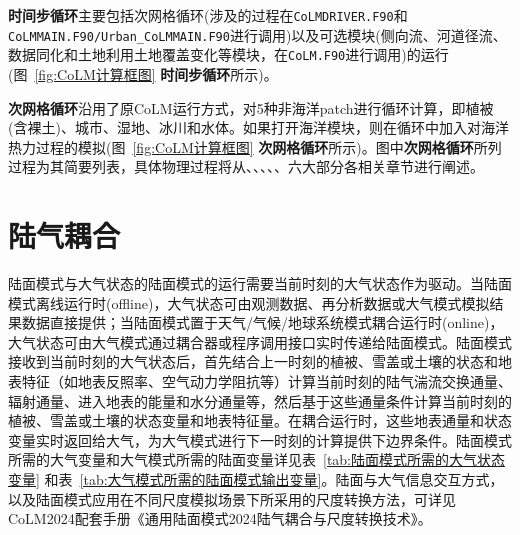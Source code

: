 \textbf{时间步循环}主要包括次网格循环(涉及的过程在\texttt{CoLMDRIVER.F90}和\texttt{CoLMMAIN.F90\allowbreak /Urban\allowbreak \_CoLMMAIN.F90}进行调用)以及可选模块(侧向流、河道径流、数据同化和土地利用土地覆盖变化等模块，在\texttt{CoLM.F90}进行调用)的运行(图~\ref{fig:CoLM计算框图} \textbf{时间步循环}所示)。

\textbf{次网格循环}沿用了原CoLM运行方式，对5种非海洋patch进行循环计算，即植被(含裸土)、城市、湿地、冰川和水体。如果打开海洋模块，则在循环中加入对海洋热力过程的模拟(图~\ref{fig:CoLM计算框图} \textbf{次网格循环}所示)。图中\textbf{次网格循环}所列过程为其简要列表，具体物理过程将从、、、、、六大部分各相关章节进行阐述。

\section{陆气耦合}\label{陆气耦合}

陆面模式与大气状态的陆面模式的运行需要当前时刻的大气状态作为驱动。当陆面模式离线运行时(offline)，大气状态可由观测数据、再分析数据或大气模式模拟结果数据直接提供；当陆面模式置于天气/气候/地球系统模式耦合运行时(online)，大气状态可由大气模式通过耦合器或程序调用接口实时传递给陆面模式。陆面模式接收到当前时刻的大气状态后，首先结合上一时刻的植被、雪盖或土壤的状态和地表特征（如地表反照率、空气动力学阻抗等）计算当前时刻的陆气湍流交换通量、辐射通量、进入地表的能量和水分通量等，然后基于这些通量条件计算当前时刻的植被、雪盖或土壤的状态变量和地表特征量。在耦合运行时，这些地表通量和状态变量实时返回给大气，为大气模式进行下一时刻的计算提供下边界条件。陆面模式所需的大气变量和大气模式所需的陆面变量详见表~\ref{tab:陆面模式所需的大气状态变量} 和表~\ref{tab:大气模式所需的陆面模式输出变量}。陆面与大气信息交互方式，以及陆面模式应用在不同尺度模拟场景下所采用的尺度转换方法，可详见CoLM2024配套手册《通用陆面模式2024陆气耦合与尺度转换技术》。

